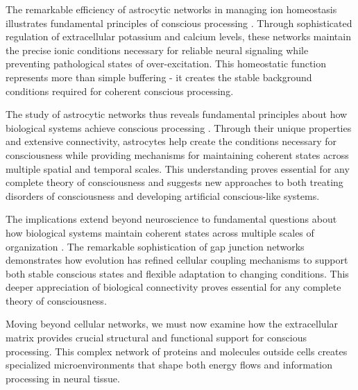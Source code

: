 The remarkable efficiency of astrocytic networks in managing ion homeostasis illustrates fundamental principles of conscious processing \cite{Bellot-Saez2017}. Through sophisticated regulation of extracellular potassium and calcium levels, these networks maintain the precise ionic conditions necessary for reliable neural signaling while preventing pathological states of over-excitation. This homeostatic function represents more than simple buffering - it creates the stable background conditions required for coherent conscious processing.

The study of astrocytic networks thus reveals fundamental principles about how biological systems achieve conscious processing \cite{Giaume2010}. Through their unique properties and extensive connectivity, astrocytes help create the conditions necessary for consciousness while providing mechanisms for maintaining coherent states across multiple spatial and temporal scales. This understanding proves essential for any complete theory of consciousness and suggests new approaches to both treating disorders of consciousness and developing artificial conscious-like systems.

The implications extend beyond neuroscience to fundamental questions about how biological systems maintain coherent states across multiple scales of organization \cite{Khakh2015}. The remarkable sophistication of gap junction networks demonstrates how evolution has refined cellular coupling mechanisms to support both stable conscious states and flexible adaptation to changing conditions. This deeper appreciation of biological connectivity proves essential for any complete theory of consciousness.

Moving beyond cellular networks, we must now examine how the extracellular matrix provides crucial structural and functional support for conscious processing. This complex network of proteins and molecules outside cells creates specialized microenvironments that shape both energy flows and information processing in neural tissue.
